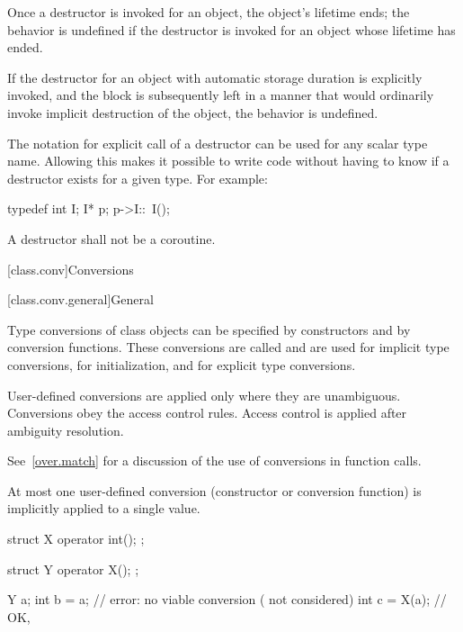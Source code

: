 \pnum
Once a destructor is invoked for an object, the object's lifetime ends;
the behavior is undefined if the destructor is invoked
for an object whose lifetime has ended.
\begin{example}
If the destructor for an object with automatic storage duration is explicitly invoked,
and the block is subsequently left in a manner that would ordinarily
invoke implicit destruction of the object, the behavior is undefined.
\end{example}

\pnum
\begin{note}
%
The notation for explicit call of a destructor can be used for any scalar type
name.
Allowing this makes it possible to write code without having to know if a
destructor exists for a given type.
For example:
\begin{codeblock}
typedef int I;
I* p;
p->I::~I();
\end{codeblock}
\end{note}

\pnum
A destructor shall not be a coroutine.

[class.conv]{Conversions}

[class.conv.general]{General}

\pnum
{}%
%
%
%
Type conversions of class objects can be specified by constructors and
by conversion functions.
These conversions are called
and are used for implicit type conversions,
for initialization,
and for explicit type conversions.

\pnum
User-defined conversions are applied only where they are unambiguous.
Conversions obey the access control rules.
Access control is applied after ambiguity resolution.

\pnum
\begin{note}
See~\ref{over.match} for a discussion of the use of conversions in function calls.
\end{note}

\pnum
{}%
At most one user-defined conversion (constructor or conversion function)
is implicitly applied to a single value.
\begin{example}
\begin{codeblock}
struct X {
  operator int();
};

struct Y {
  operator X();
};

Y a;
int b = a;          // error: no viable conversion ( not considered)
int c = X(a);       // OK, 
\end{codeblock}
\end{example}

